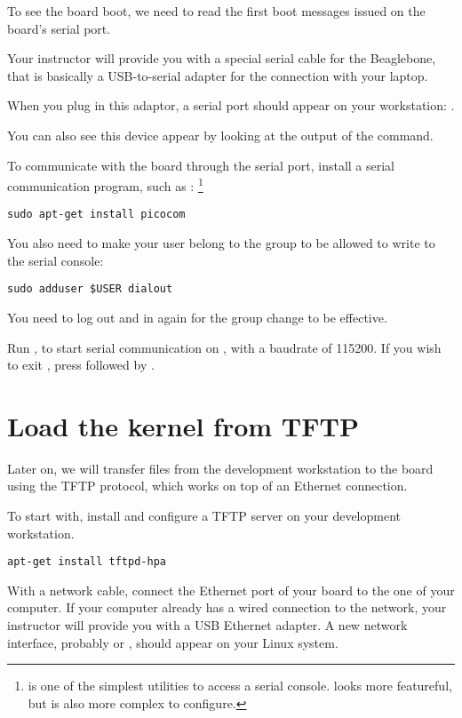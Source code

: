 To see the board boot, we need to read the first boot messages issued
on the board's serial port.

Your instructor will provide you with a special serial cable for the
Beaglebone, that is basically a USB-to-serial adapter for the
connection with your laptop.

When you plug in this adaptor, a serial port should appear on your
workstation: .

You can also see this device appear by looking at the output of the
 command.

To communicate with the board through the serial port, install a
serial communication program, such as :
\footnote{ is one of the simplest utilities to access a
  serial console.  looks more featureful, but is also
  more complex to configure.}

\begin{verbatim}
sudo apt-get install picocom
\end{verbatim}

You also need to make your user belong to the  group to be
allowed to write to the serial console:

\begin{verbatim}
sudo adduser $USER dialout
\end{verbatim}

You need to log out and in again for the group change to be effective.

Run , to start serial
communication on , with a baudrate of 115200. If
you wish to exit , press \code{[Ctrl][a]} followed by
\code{[Ctrl][x]}.

\section{Load the kernel from TFTP}

Later on, we will transfer files from the development workstation to
the board using the TFTP protocol, which works on top of an Ethernet
connection.

To start with, install and configure a TFTP server on your development
workstation.

\begin{verbatim}
apt-get install tftpd-hpa
\end{verbatim}

With a network cable, connect the Ethernet port of your board to the
one of your computer. If your computer already has a wired connection
to the network, your instructor will provide you with a USB Ethernet
adapter. A new network interface, probably  or ,
should appear on your Linux system.

